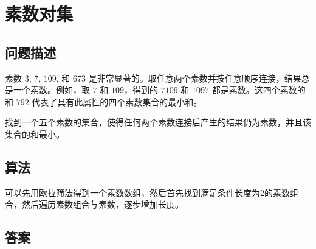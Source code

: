\section{素数对集}
\subsection{问题描述}
\begin{tcolorbox}
素数 $3$, $7$, $109$, 和 $673$ 是非常显著的。取任意两个素数并按任意顺序连接，结果总是一个素数。例如，取 $7$ 和 $109$，得到的 $7109$ 和 $1097$ 都是素数。这四个素数的和 $792$ 代表了具有此属性的四个素数集合的最小和。

找到一个五个素数的集合，使得任何两个素数连接后产生的结果仍为素数，并且该集合的和最小。
\end{tcolorbox}

\subsection{算法}
可以先用欧拉筛法得到一个素数数组，然后首先找到满足条件长度为2的素数组合，然后遍历素数组合与素数，逐步增加长度。

\subsection{答案}
